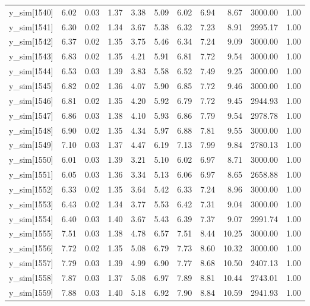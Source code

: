 \begin{table}[ht]
\begin{tabular}{rrrrrrrrrrr}
  y\_sim[1540] & 6.02 & 0.03 & 1.37 & 3.38 & 5.09 & 6.02 & 6.94 & 8.67 & 3000.00 & 1.00 \\ 
  y\_sim[1541] & 6.30 & 0.02 & 1.34 & 3.67 & 5.38 & 6.32 & 7.23 & 8.91 & 2995.17 & 1.00 \\ 
  y\_sim[1542] & 6.37 & 0.02 & 1.35 & 3.75 & 5.46 & 6.34 & 7.24 & 9.09 & 3000.00 & 1.00 \\ 
  y\_sim[1543] & 6.83 & 0.02 & 1.35 & 4.21 & 5.91 & 6.81 & 7.72 & 9.54 & 3000.00 & 1.00 \\ 
  y\_sim[1544] & 6.53 & 0.03 & 1.39 & 3.83 & 5.58 & 6.52 & 7.49 & 9.25 & 3000.00 & 1.00 \\ 
  y\_sim[1545] & 6.82 & 0.02 & 1.36 & 4.07 & 5.90 & 6.85 & 7.72 & 9.46 & 3000.00 & 1.00 \\ 
  y\_sim[1546] & 6.81 & 0.02 & 1.35 & 4.20 & 5.92 & 6.79 & 7.72 & 9.45 & 2944.93 & 1.00 \\ 
  y\_sim[1547] & 6.86 & 0.03 & 1.38 & 4.10 & 5.93 & 6.86 & 7.79 & 9.54 & 2978.78 & 1.00 \\ 
  y\_sim[1548] & 6.90 & 0.02 & 1.35 & 4.34 & 5.97 & 6.88 & 7.81 & 9.55 & 3000.00 & 1.00 \\ 
  y\_sim[1549] & 7.10 & 0.03 & 1.37 & 4.47 & 6.19 & 7.13 & 7.99 & 9.84 & 2780.13 & 1.00 \\ 
  y\_sim[1550] & 6.01 & 0.03 & 1.39 & 3.21 & 5.10 & 6.02 & 6.97 & 8.71 & 3000.00 & 1.00 \\ 
  y\_sim[1551] & 6.05 & 0.03 & 1.36 & 3.34 & 5.13 & 6.06 & 6.97 & 8.65 & 2658.88 & 1.00 \\ 
  y\_sim[1552] & 6.33 & 0.02 & 1.35 & 3.64 & 5.42 & 6.33 & 7.24 & 8.96 & 3000.00 & 1.00 \\ 
  y\_sim[1553] & 6.43 & 0.02 & 1.34 & 3.77 & 5.53 & 6.42 & 7.31 & 9.04 & 3000.00 & 1.00 \\ 
  y\_sim[1554] & 6.40 & 0.03 & 1.40 & 3.67 & 5.43 & 6.39 & 7.37 & 9.07 & 2991.74 & 1.00 \\ 
  y\_sim[1555] & 7.51 & 0.03 & 1.38 & 4.78 & 6.57 & 7.51 & 8.44 & 10.25 & 3000.00 & 1.00 \\ 
  y\_sim[1556] & 7.72 & 0.02 & 1.35 & 5.08 & 6.79 & 7.73 & 8.60 & 10.32 & 3000.00 & 1.00 \\ 
  y\_sim[1557] & 7.79 & 0.03 & 1.39 & 4.99 & 6.90 & 7.77 & 8.68 & 10.50 & 2407.13 & 1.00 \\ 
  y\_sim[1558] & 7.87 & 0.03 & 1.37 & 5.08 & 6.97 & 7.89 & 8.81 & 10.44 & 2743.01 & 1.00 \\ 
  y\_sim[1559] & 7.88 & 0.03 & 1.40 & 5.18 & 6.92 & 7.90 & 8.84 & 10.59 & 2941.93 & 1.00 \\ 

\end{tabular}
\end{table}
